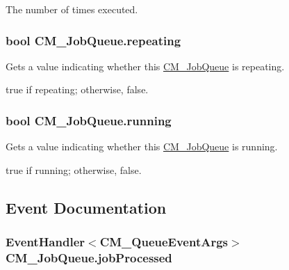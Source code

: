 The number of times executed.\hypertarget{class_c_m___job_queue_a652f13e97ccd6cd66fe899e0d4612842}{}
\subsubsection[{repeating}]{\setlength{\rightskip}{0pt plus 5cm}bool C\+M\+\_\+\+Job\+Queue.\+repeating\hspace{0.3cm}{\ttfamily [get]}}\label{class_c_m___job_queue_a652f13e97ccd6cd66fe899e0d4612842}


Gets a value indicating whether this \hyperlink{class_c_m___job_queue}{C\+M\+\_\+\+Job\+Queue} is repeating. 

{\ttfamily true} if repeating; otherwise, {\ttfamily false}.\hypertarget{class_c_m___job_queue_aa7e3982beb8c64bf115c0adc30134d84}{}
\subsubsection[{running}]{\setlength{\rightskip}{0pt plus 5cm}bool C\+M\+\_\+\+Job\+Queue.\+running\hspace{0.3cm}{\ttfamily [get]}}\label{class_c_m___job_queue_aa7e3982beb8c64bf115c0adc30134d84}


Gets a value indicating whether this \hyperlink{class_c_m___job_queue}{C\+M\+\_\+\+Job\+Queue} is running. 

{\ttfamily true} if running; otherwise, {\ttfamily false}.

\subsection{Event Documentation}
\hypertarget{class_c_m___job_queue_a331d3a29f310ac03de1e631e6af67404}{}
\subsubsection[{job\+Processed}]{\setlength{\rightskip}{0pt plus 5cm}Event\+Handler$<${\bf C\+M\+\_\+\+Queue\+Event\+Args}$>$ C\+M\+\_\+\+Job\+Queue.\+job\+Processed\hspace{0.3cm}{\ttfamily [protected]}}\label{class_c_m___job_queue_a331d3a29f310ac03de1e631e6af67404}



